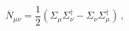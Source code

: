\begin{equation}
\overline{N}_{\mu\nu}=\frac{1}{2}(\Sigma_{\mu}\Sigma_{\nu}^{\dagger}-
\Sigma_{\nu}\Sigma_{\mu}^{\dagger})\,,\label{eq:2.12}
\end{equation}

